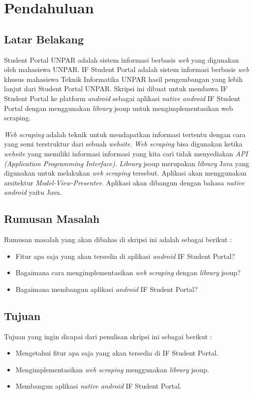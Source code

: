 \chapter{Pendahuluan}
\label{chap:intro}
   
\section{Latar Belakang}
\label{sec:label}

Student Portal UNPAR adalah sistem informasi berbasis \textit{web} yang digunakan oleh mahasiswa UNPAR. IF Student Portal adalah sistem informasi berbasis \textit{web} khusus mahasiswa Teknik Informatika UNPAR hasil pengembangan yang lebih lanjut dari Student Portal UNPAR. Skripsi ini dibuat untuk membawa IF Student Portal ke platform \textit{android} sebagai aplikasi \textit{native android} IF Student Portal dengan menggunakan \textit{library} jsoup untuk mengimplementasikan web scraping. 

\textit{Web scraping} adalah teknik untuk mendapatkan informasi tertentu dengan cara yang semi terstruktur dari sebuah \textit{website}. \textit{Web scraping} bisa digunakan ketika \textit{website} yang memiliki informasi informasi yang kita cari tidak menyediakan \textit{API (Application Programming Interface)}. \textit{Library} jsoup\cite{jsoup} merupakan \textit{library} Java yang digunakan untuk melakukan \textit{web scraping} tersebut. Aplikasi akan menggunakan arsitektur \textit{Model-View-Presenter}. Aplikasi akan dibangun dengan bahasa \textit{native android} yaitu Java.


\section{Rumusan Masalah}
\label{sec:rumusan}
Rumusan masalah yang akan dibahas di skripsi ini adalah sebagai berikut :
\begin{itemize}
    \item Fitur apa saja yang akan tersedia di aplikasi \textit{android} IF Student Portal?
    \item Bagaimana cara mengimplementasikan \textit{web scraping} dengan \textit{library} jsoup?
    \item Bagaimana membangun aplikasi \textit{android} IF Student Portal?
\end{itemize}

\section{Tujuan}
\label{sec:tujuan}
Tujuan yang ingin dicapai dari penulisan skripsi ini sebagai berikut :
\begin{itemize}
    \item Mengetahui fitur apa saja yang akan tersedia di IF Student Portal.
    \item Mengimplementasikan \textit{web scraping} menggunakan \textit{library} jsoup.
    \item Membangun aplikasi \textit{native android} IF Student Portal.
    
\end{itemize}


